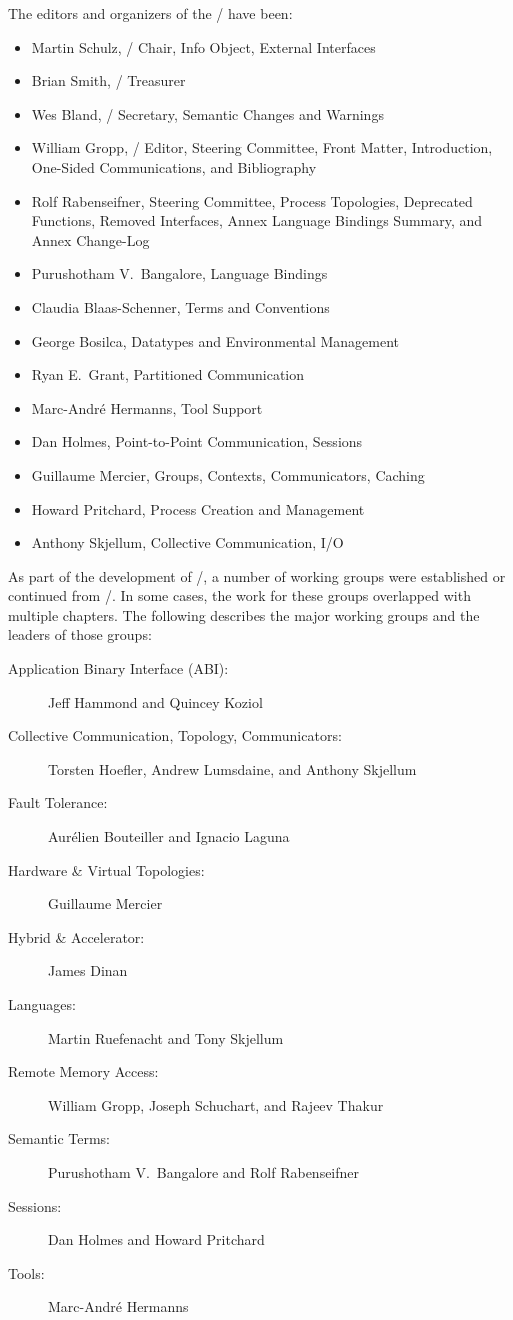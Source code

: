 \noindent The editors and organizers of the \MPIIVDOTI/ have been:
\begin{itemize}
\item Martin Schulz, \MPIIVDOTI/ Chair, Info Object, External Interfaces
\item Brian Smith, \MPIIVDOTI/ Treasurer
\item Wes Bland, \MPIIVDOTI/ Secretary, Semantic Changes and Warnings
\item William Gropp, \MPIIVDOTI/ Editor, Steering Committee, Front Matter,
      Introduction, One-Sided Communications, and Bibliography
\item Rolf Rabenseifner, Steering Committee,
  Process Topologies, Deprecated Functions, Removed Interfaces,
  Annex Language Bindings Summary, and Annex Change-Log

\item Purushotham V.~Bangalore, Language Bindings
\item Claudia Blaas-Schenner, Terms and Conventions
\item George Bosilca, Datatypes and Environmental Management
\item Ryan E.~Grant, Partitioned Communication
\item Marc-Andr\'e Hermanns, Tool Support
\item Dan Holmes, Point-to-Point Communication, Sessions
\item Guillaume Mercier, Groups, Contexts, Communicators, Caching
\item Howard Pritchard, Process Creation and Management
\item Anthony Skjellum, Collective Communication, I/O
\end{itemize}

\noindent As part of the development of \MPIIVDOTI/, a number of
working groups were established or continued from \MPIIVDOTO/.
In some cases, the work for these groups overlapped with multiple
chapters.
The following describes the major working groups and the leaders of
those groups:

{\raggedright
\begin{description}
\item[Application Binary Interface (ABI):]Jeff Hammond and Quincey Koziol
\item[Collective Communication, Topology, Communicators:]Torsten
Hoefler, Andrew Lumsdaine, and Anthony Skjellum
\item[Fault Tolerance:]Aur\'elien Bouteiller and Ignacio Laguna
\item[Hardware \& Virtual Topologies:]Guillaume Mercier
\item[Hybrid \& Accelerator:]James Dinan
\item[Languages:]Martin Ruefenacht and Tony Skjellum
\item[Remote Memory Access:]William Gropp, Joseph Schuchart, and Rajeev Thakur
\item[Semantic Terms:]Purushotham V.~Bangalore and Rolf Rabenseifner
\item[Sessions:]Dan Holmes and Howard Pritchard
\item[Tools:]Marc-Andr\'e Hermanns
\end{description}
}

